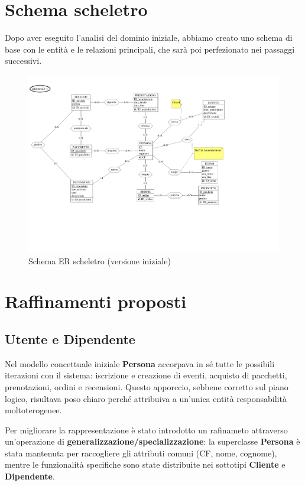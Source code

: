 \documentclass[a4paper,12pt]{report}
\begin{document}
\section{Schema scheletro}
Dopo aver eseguito l'analisi del dominio iniziale, abbiamo creato uno schema di base con le entità e le relazioni principali,
che sarà poi perfezionato nei passaggi successivi.
\begin{figure}[H]
	\centering
	\includegraphics[width=\textwidth, trim=0 100pt 150pt 0 , clip]{./pdf/scheletro.pdf}
	\caption{Schema ER scheletro (versione iniziale)}
	\label{fig:schema-scheletro}
\end{figure}

\section{Raffinamenti proposti}
\subsection{Utente e Dipendente}
Nel modello concettuale iniziale \textbf{Persona} accorpava in sé tutte le possibili iterazioni con il sistema: iscrizione e creazione
di eventi, acquisto di pacchetti, prenotazioni, ordini e recensioni. Questo apporccio, sebbene corretto sul piano logico, risultava poso chiaro
perché attribuiva a un'unica entità responsabilità moltoterogenee.

\vspace{\baselineskip}
Per migliorare la rappresentazione è stato introdotto un rafinameto
attraverso un'operazione di \textbf{generalizzazione/specializzazione}: la superclasse \textbf{Persona} è stata mantenuta
per raccogliere gli attributi comuni (CF, nome, cognome), mentre le funzionalità specifiche sono state distribuite nei sottotipi
\textbf{Cliente} e \textbf{Dipendente}.
\end{document}
